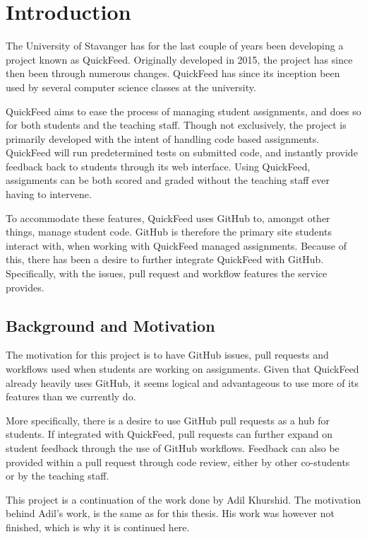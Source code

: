 
\chapter{Introduction}
\label{ch:intro}

The University of Stavanger has for the last couple of years been developing a project known as QuickFeed.
Originally developed in 2015, the project has since then been through numerous changes. %
QuickFeed has since its inception been used by several computer science classes at the university.

QuickFeed aims to ease the process of managing student assignments, and does so for both students and the teaching staff.
Though not exclusively, the project is primarily developed with the intent of handling code based assignments.
QuickFeed will run predetermined tests on submitted code, and instantly provide feedback back to students through its web interface.
Using QuickFeed, assignments can be both scored and graded without the teaching staff ever having to intervene.

To accommodate these features, QuickFeed uses GitHub to, amongst other things, manage student code.
GitHub is therefore the primary site students interact with, when working with QuickFeed managed assignments.
Because of this, there has been a desire to further integrate QuickFeed with GitHub.
Specifically, with the issues, pull request and workflow features the service provides.

\section{Background and Motivation}
\label{sec:motivation}

The motivation for this project is to have GitHub issues, pull requests and workflows used when students are working on assignments.
Given that QuickFeed already heavily uses GitHub, it seems logical and advantageous to use more of its features than we currently do.

More specifically, there is a desire to use GitHub pull requests as a hub for students.
If integrated with QuickFeed, pull requests can further expand on student feedback through the use of GitHub workflows.
Feedback can also be provided within a pull request through code review, either by other co-students or by the teaching staff.

This project is a continuation of the work done by Adil Khurshid. %
The motivation behind Adil's work, is the same as for this thesis.
His work was however not finished, which is why it is continued here.

